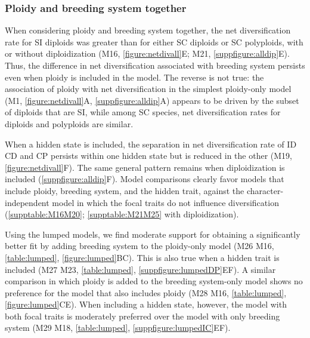 \subsubsection{Ploidy and breeding system together}

When considering ploidy and breeding system together, the net diversification rate for SI diploids was greater than for either SC diploids or SC polyploids, with or without diploidization (M16, \cref{figure:netdivall}E; M21, \cref{suppfigure:alldip}E).
Thus, the difference in net diversification associated with breeding system persists even when ploidy is included in the model.
The reverse is not true: the association of ploidy with net diversification in the simplest ploidy-only model (M1, \cref{figure:netdivall}A, \cref{suppfigure:alldip}A) appears to be driven by the subset of diploids that are SI, while among SC species, net diversification rates for diploids and polyploids are similar.

When a hidden state is included, the separation in net diversification rate of ID \vs CD and CP persists within one hidden state but is reduced in the other (M19, \cref{figure:netdivall}F).
The same general pattern remains when diploidization is included (\cref{suppfigure:alldip}F).
Model comparisons clearly favor models that include ploidy, breeding system, and the hidden trait, against the character-independent model in which the focal traits do not influence diversification (\cref{supptable:M16M20}; \cref{supptable:M21M25} with diploidization).

Using the lumped models, we find moderate support for obtaining a significantly better fit by adding breeding system to the ploidy-only model (M26 \vs M16, \cref{table:lumped}, \cref{figure:lumped}BC).
This is also true when a hidden trait is included (M27 \vs M23, \cref{table:lumped}, \cref{suppfigure:lumpedDP}EF).
A similar comparison in which ploidy is added to the breeding system-only model shows no preference for the model that also includes ploidy (M28 \vs M16, \cref{table:lumped}, \cref{figure:lumped}CE).
When including a hidden state, however, the model with both focal traits is moderately preferred over the model with only breeding system (M29 \vs M18, \cref{table:lumped}, \cref{suppfigure:lumpedIC}EF).


